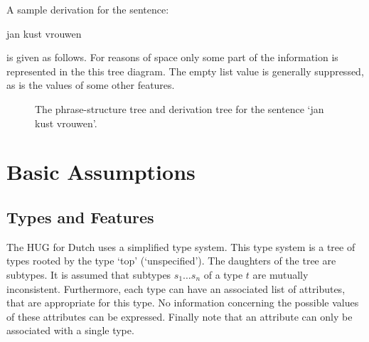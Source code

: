 A sample derivation for the sentence:
\begin{exam}
jan kust vrouwen
\end{exam}
is given as follows. For reasons of space only some part of the information is
represented in the this tree diagram. The empty list value is generally suppressed,
as is the values of some other features. 

\begin{figure}[p]

\vspace{-30ex}

\par

\vspace{20ex}

\par\hspace{150pt}


\caption{\label{fig1}The phrase-structure tree and derivation tree for
the sentence `jan kust vrouwen'.}

\end{figure}


\nodeskip{150pt}
\tree{\noexpand\plcmdeq}
\leaf{\noexpand\plcmder}
\tree{\noexpand\plcmdes}
\leaf{\noexpand\plcmdet}
\leaf{\noexpand\plcmdeu}
\endtree
\endtree

\nodeskip{45pt}
\tree{\noexpand\plcmdev}
\leaf{\noexpand\plcmdew}
\tree{\noexpand\plcmdex}
\leaf{\noexpand\plcmdey}
\leaf{\noexpand\plcmdez}
\endtree
\endtree

\section{Basic Assumptions}

\subsection{Types and Features}

The HUG for Dutch uses a simplified type system. This type system is a
tree of types rooted by the type `top' (`unspecified'). The daughters
of the tree are subtypes. It is assumed that subtypes $s_1 \dots s_n$
of a type $t$ are mutually inconsistent. Furthermore, each type can
have an associated list of attributes, that are appropriate for this
type. No information concerning the possible values of these
attributes can be expressed. Finally note that an attribute can only
be associated with a single type. 

